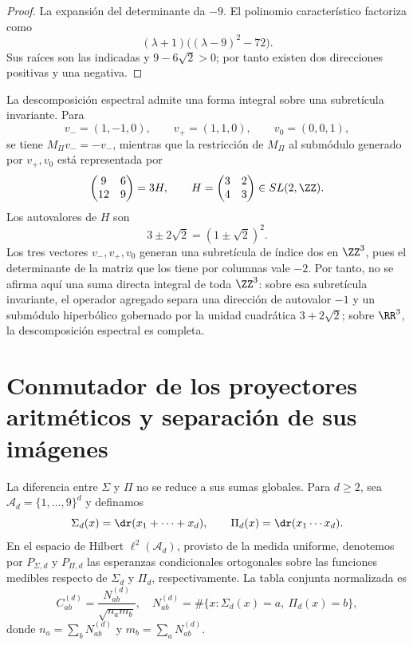 \begin{proof}
La expansión del determinante da \(-9\). El polinomio característico
factoriza como
\[
 (\lambda+1)\bigl((\lambda-9)^2-72\bigr).
\]
Sus raíces son las indicadas y \(9-6\sqrt2>0\); por tanto existen dos
direcciones positivas y una negativa.
\end{proof}

La descomposición espectral admite una forma integral sobre una subretícula
invariante. Para
\[
 v_-=(1,-1,0),\qquad v_+=(1,1,0),\qquad v_0=(0,0,1),
\]
se tiene \(M_\Pi v_-=-v_-\), mientras que la restricción de \(M_\Pi\) al
submódulo generado por \(v_+,v_0\) está representada por
\[
 \begin{pmatrix}9&6\\12&9\end{pmatrix}
 =3H,\qquad
 H=\begin{pmatrix}3&2\\4&3\end{pmatrix}\in SL(2,\ZZ).
\]
Los autovalores de \(H\) son
\[
 3\pm2\sqrt2=(1\pm\sqrt2)^2.
\]
Los tres vectores \(v_-,v_+,v_0\) generan una subretícula de índice dos en
\(\ZZ^3\), pues el determinante de la matriz que los tiene por columnas vale
\(-2\). Por tanto, no se afirma aquí una suma directa integral de toda
\(\ZZ^3\): sobre esa subretícula invariante, el operador agregado separa una
dirección de autovalor \(-1\) y un submódulo hiperbólico gobernado por la
unidad cuadrática \(3+2\sqrt2\); sobre \(\RR^3\), la descomposición espectral
es completa.

\section{Conmutador de los proyectores aritméticos y separación de sus imágenes}

La diferencia entre \(\Sigma\) y \(\Pi\) no se reduce a sus sumas globales.
Para \(d\ge2\), sea \(\mathscr A_d=\{1,\ldots,9\}^d\) y definamos
\[
 \Sigma_d(x)=\dr(x_1+\cdots+x_d),\qquad
 \Pi_d(x)=\dr(x_1\cdots x_d).
\]
En el espacio de Hilbert \(\ell^2(\mathscr A_d)\), provisto de la medida
uniforme, denotemos por \(P_{\Sigma,d}\) y \(P_{\Pi,d}\) las esperanzas
condicionales ortogonales sobre las funciones medibles respecto de
\(\Sigma_d\) y \(\Pi_d\), respectivamente. La tabla conjunta normalizada es
\[
 C^{(d)}_{ab}
 =\frac{N^{(d)}_{ab}}{\sqrt{n_a m_b}},
\quad
 N^{(d)}_{ab}
 =\#\{x:\Sigma_d(x)=a,\ \Pi_d(x)=b\},
\]
donde \(n_a=\sum_bN^{(d)}_{ab}\) y \(m_b=\sum_aN^{(d)}_{ab}\).

